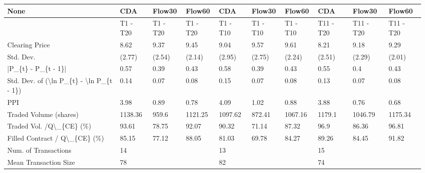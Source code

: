 \begin{tabular}{llllllllll}
\hline
 None                                                      & CDA      & Flow30   & Flow60   & CDA      & Flow30   & Flow60   & CDA       & Flow30    & Flow60    \\
\hline
                                                           & T1 - T20 & T1 - T20 & T1 - T20 & T1 - T10 & T1 - T10 & T1 - T10 & T11 - T20 & T11 - T20 & T11 - T20 \\
 Clearing Price                                            & 8.62     & 9.37     & 9.45     & 9.04     & 9.57     & 9.61     & 8.21      & 9.18      & 9.29      \\
 Std. Dev.                                                 & (2.77)   & (2.54)   & (2.14)   & (2.95)   & (2.75)   & (2.24)   & (2.51)    & (2.29)    & (2.01)    \\
 |P\_\{t\} - P\_\{t - 1\}|                                       & 0.57     & 0.39     & 0.43     & 0.58     & 0.39     & 0.43     & 0.55      & 0.4       & 0.43      \\
 Std. Dev. of (\textbackslash{}ln P\_\{t\} - \textbackslash{}ln P\_\{t - 1\})                  & 0.14     & 0.07     & 0.08     & 0.15     & 0.07     & 0.08     & 0.13      & 0.07      & 0.08      \\
 PPI                                                       & 3.98     & 0.89     & 0.78     & 4.09     & 1.02     & 0.88     & 3.88      & 0.76      & 0.68      \\
 Traded Volume (shares)                                    & 1138.36  & 959.6    & 1121.25  & 1097.62  & 872.41   & 1067.16  & 1179.1    & 1046.79   & 1175.34   \\
 Traded Vol. /Q\textbackslash{}\_\{CE\} (\%)                                  & 93.61    & 78.75    & 92.07    & 90.32    & 71.14    & 87.32    & 96.9      & 86.36     & 96.81     \\
 Filled Contract / Q\textbackslash{}\_\{CE\} (\%)                             & 85.15    & 77.12    & 88.05    & 81.03    & 69.78    & 84.27    & 89.26     & 84.45     & 91.82     \\
 Num. of Transactions                                      & 14       &          &          & 13       &          &          & 15        &           &           \\
 Mean Transaction Size                                     & 78       &          &          & 82       &          &          & 74        &           &           \\

\end{tabular}
